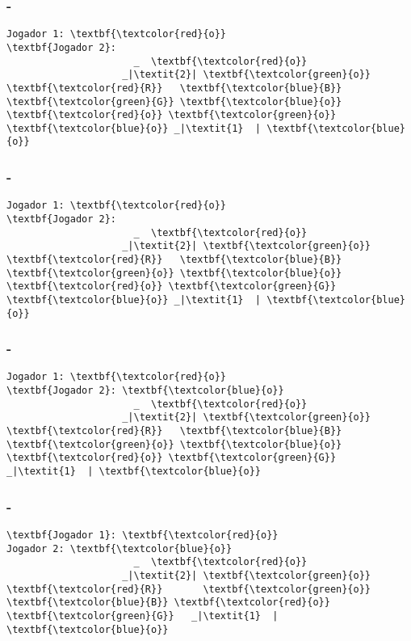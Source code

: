 \begin{frame}[fragile]
\frametitle{\secname - \subsecname}
\begin{Verbatim}[commandchars=\\\{\}]
Jogador 1: \textbf{\textcolor{red}{o}}
\textbf{Jogador 2}:
                      _  \textbf{\textcolor{red}{o}}
                    _|\textit{2}| \textbf{\textcolor{green}{o}}
\textbf{\textcolor{red}{R}}   \textbf{\textcolor{blue}{B}}   \textbf{\textcolor{green}{G}} \textbf{\textcolor{blue}{o}} \textbf{\textcolor{red}{o}} \textbf{\textcolor{green}{o}} \textbf{\textcolor{blue}{o}} _|\textit{1}  | \textbf{\textcolor{blue}{o}}
\end{Verbatim}
\end{frame}

\begin{frame}[fragile]
\frametitle{\secname - \subsecname}
\begin{Verbatim}[commandchars=\\\{\}]
Jogador 1: \textbf{\textcolor{red}{o}}
\textbf{Jogador 2}:
                      _  \textbf{\textcolor{red}{o}}
                    _|\textit{2}| \textbf{\textcolor{green}{o}}
\textbf{\textcolor{red}{R}}   \textbf{\textcolor{blue}{B}}   \textbf{\textcolor{green}{o}} \textbf{\textcolor{blue}{o}} \textbf{\textcolor{red}{o}} \textbf{\textcolor{green}{G}} \textbf{\textcolor{blue}{o}} _|\textit{1}  | \textbf{\textcolor{blue}{o}}
\end{Verbatim}
\end{frame}

\begin{frame}[fragile]
\frametitle{\secname - \subsecname}
\begin{Verbatim}[commandchars=\\\{\}]
Jogador 1: \textbf{\textcolor{red}{o}}
\textbf{Jogador 2}: \textbf{\textcolor{blue}{o}}
                      _  \textbf{\textcolor{red}{o}}
                    _|\textit{2}| \textbf{\textcolor{green}{o}}
\textbf{\textcolor{red}{R}}   \textbf{\textcolor{blue}{B}}   \textbf{\textcolor{green}{o}} \textbf{\textcolor{blue}{o}} \textbf{\textcolor{red}{o}} \textbf{\textcolor{green}{G}}   _|\textit{1}  | \textbf{\textcolor{blue}{o}}
\end{Verbatim}
\end{frame}

\begin{frame}[fragile]
\frametitle{\secname - \subsecname}
\begin{Verbatim}[commandchars=\\\{\}]
\textbf{Jogador 1}: \textbf{\textcolor{red}{o}}
Jogador 2: \textbf{\textcolor{blue}{o}}
                      _  \textbf{\textcolor{red}{o}}
                    _|\textit{2}| \textbf{\textcolor{green}{o}}
\textbf{\textcolor{red}{R}}       \textbf{\textcolor{green}{o}} \textbf{\textcolor{blue}{B}} \textbf{\textcolor{red}{o}} \textbf{\textcolor{green}{G}}   _|\textit{1}  | \textbf{\textcolor{blue}{o}}
\end{Verbatim}
\end{frame}

